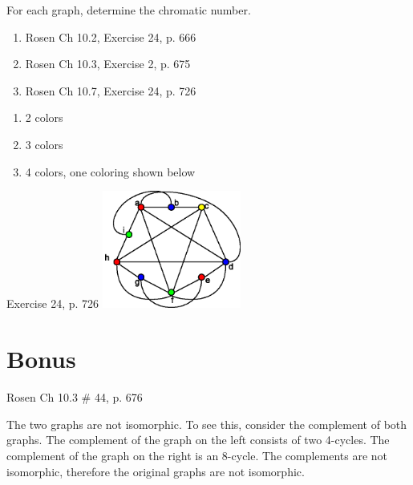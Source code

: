 \begin{questions}
 For each graph, determine the chromatic number.
\begin{enumerate}[label=(\alph*), topsep=0pt,itemsep=0pt,parsep=0pt]
    \item Rosen Ch 10.2, Exercise 24, p. 666
    \item Rosen Ch 10.3, Exercise 2, p. 675
    \item Rosen Ch 10.7, Exercise 24, p. 726  %
\end{enumerate}
    \ifprintanswers
        \vspace{-10pt}
    \fi
    \begin{solution}
    \begin{enumerate}[label=(\alph*), topsep=0pt,itemsep=0pt,parsep=0pt]
        \item 2 colors
        \item 3 colors
        \item 4 colors, one coloring shown below
    \end{enumerate}
    Exercise 24, p. 726
    \includegraphics[width=1.8in]{figs/hw10-p22}
    \end{solution}





\section*{Bonus}




\bonusquestion[1] Rosen Ch 10.3 \# 44, p. 676
    \ifprintanswers
        \vspace{-10pt}
    \fi
    \begin{solution}
        The two graphs are not isomorphic.  To see this, consider the complement of both graphs.  The complement of the graph on the left consists of two 4-cycles.  The complement of the graph on the right is an 8-cycle.  The complements are not isomorphic, therefore the original graphs are not isomorphic.
    \end{solution}



\end{questions}
